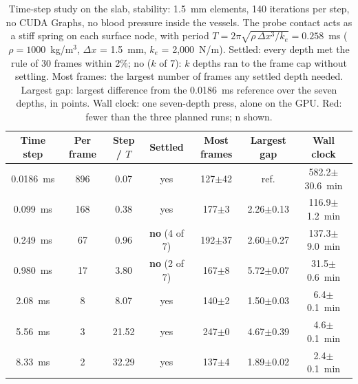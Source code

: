 \begin{table}[t]
\centering
\caption{Time-step study on the slab, stability: 1.5~mm elements, 140 iterations per step, no CUDA Graphs, no blood
pressure inside the vessels. The probe contact acts as a stiff spring on each surface node, with period
$T = 2\pi\sqrt{\rho\,\Delta x^3/k_e} = 0.258$~ms ($\rho = 1000$~kg/m$^3$, $\Delta x$ = 1.5~mm,
$k_e$ = 2,000~N/m). Settled: every depth met the rule of 30 frames within 2\%; no ($k$ of 7): $k$ depths ran to the frame cap without
settling. Most frames: the largest number of frames any settled depth needed. Largest gap: largest difference from the 0.0186~ms reference over the seven depths, in
points. Wall clock: one seven-depth press, alone on the GPU. Red: fewer than the three planned runs; n shown.}
\label{tab:timestep_results}
\footnotesize
\setlength{\tabcolsep}{6pt}
\begin{tabular}{ccccccc}
\hline
\textbf{Time step} & \textbf{Per frame} & \textbf{Step / $T$} & \textbf{Settled} & \textbf{Most frames} &
\textbf{Largest gap} & \textbf{Wall clock} \\
\hline
0.0186~ms & 896 & 0.07 & yes & 127$\pm$42 & ref. & 582.2$\pm$30.6~min \\
0.099~ms & 168 & 0.38 & yes & 177$\pm$3 & 2.26$\pm$0.13 & 116.9$\pm$1.2~min \\
0.249~ms & 67 & 0.96 & \textbf{no} (4 of 7) & 192$\pm$37 & 2.60$\pm$0.27 & 137.3$\pm$9.0~min \\
0.980~ms & 17 & 3.80 & \textbf{no} (2 of 7) & 167$\pm$8 & 5.72$\pm$0.07 & 31.5$\pm$0.6~min \\
2.08~ms & 8 & 8.07 & yes & 140$\pm$2 & 1.50$\pm$0.03 & 6.4$\pm$0.1~min \\
5.56~ms & 3 & 21.52 & yes & 247$\pm$0 & 4.67$\pm$0.39 & 4.6$\pm$0.1~min \\
8.33~ms & 2 & 32.29 & yes & 137$\pm$4 & 1.89$\pm$0.02 & 2.4$\pm$0.1~min \\
\hline
\end{tabular}
\end{table}
